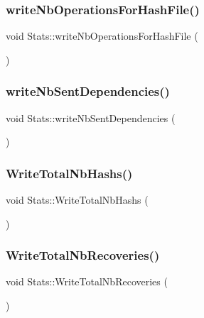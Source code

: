 \subsubsection{\texorpdfstring{write\+Nb\+Operations\+For\+Hash\+File()}{writeNbOperationsForHashFile()}}
{\footnotesize\ttfamily void Stats\+::write\+Nb\+Operations\+For\+Hash\+File (\begin{DoxyParamCaption}{ }\end{DoxyParamCaption})\hspace{0.3cm}{\ttfamily [private]}}

\mbox{\label{class_stats_a5e7dc3debec2bdc35b11e713283ab0b3}} 
\subsubsection{\texorpdfstring{write\+Nb\+Sent\+Dependencies()}{writeNbSentDependencies()}}
{\footnotesize\ttfamily void Stats\+::write\+Nb\+Sent\+Dependencies (\begin{DoxyParamCaption}{ }\end{DoxyParamCaption})\hspace{0.3cm}{\ttfamily [private]}}

\mbox{\label{class_stats_a89cedfe36937b0f9a5f525a8858e54f2}} 
\subsubsection{\texorpdfstring{Write\+Total\+Nb\+Hashs()}{WriteTotalNbHashs()}}
{\footnotesize\ttfamily void Stats\+::\+Write\+Total\+Nb\+Hashs (\begin{DoxyParamCaption}{ }\end{DoxyParamCaption})\hspace{0.3cm}{\ttfamily [private]}}

\mbox{\label{class_stats_a75689d1481b0605ce74d775e36c21740}} 
\subsubsection{\texorpdfstring{Write\+Total\+Nb\+Recoveries()}{WriteTotalNbRecoveries()}}
{\footnotesize\ttfamily void Stats\+::\+Write\+Total\+Nb\+Recoveries (\begin{DoxyParamCaption}{ }\end{DoxyParamCaption})\hspace{0.3cm}{\ttfamily [private]}}

